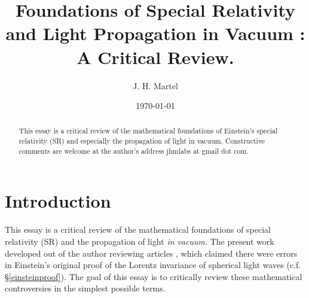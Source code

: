 \documentclass[12pt]{article}
\begin{document}
\title{Foundations of Special Relativity and Light Propagation in Vacuum : A Critical Review.}


\author{J. H. Martel}
\date{\today}

\maketitle

\begin{abstract}
This essay is a critical review of the mathematical foundations of Einstein's special relativity (SR) and especially the propagation of light in vacuum. Constructive comments are welcome at the author's address jhmlabs at gmail dot com. 




\end{abstract}









\section*{Introduction}
This essay is a critical review of the mathematical foundations of special relativity (SR) and the propagation of light \emph{in vacuum}. The present work developed out of the author reviewing articles \cite{bryant}, \cite{crothers} which claimed there were errors in Einstein's original proof of the Lorentz invariance of spherical light waves (c.f. \S \ref{einsteinproof}). The goal of this essay is to critically review these mathematical controversies in the simplest possible terms.
\end{document}
